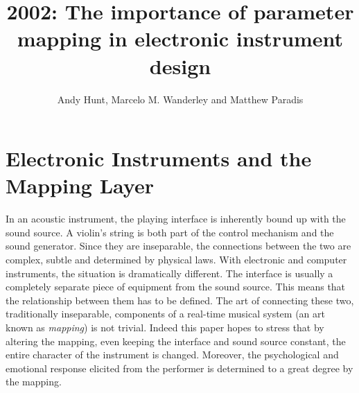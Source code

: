 
\graphicspath{  {mainmatter/Hunt_2002/} }
\title*{2002: The importance of parameter mapping in electronic instrument design}

\author{Andy Hunt, Marcelo M. Wanderley and Matthew Paradis}

%
%
\maketitle


\section{Electronic Instruments and the Mapping Layer}

In an acoustic instrument, the playing interface is inherently bound up with the
sound source.  A violin's string is both part of the control mechanism and the
sound generator.  Since they are inseparable, the connections between the two are
complex, subtle and determined by physical laws.  With electronic and computer
instruments, the situation is dramatically different.  The interface is usually a
completely separate piece of equipment from the sound source.  This means that
the relationship between them has to be defined.  The art of connecting these
two, traditionally inseparable, components of a real-time musical system (an art
known as \textit{mapping}) is not trivial.  Indeed this paper hopes to stress
that by altering the mapping, even keeping the interface and sound source
constant, the entire character of the instrument is changed.  Moreover, the
psychological and emotional response elicited from the performer is determined to
a great degree by the mapping.

